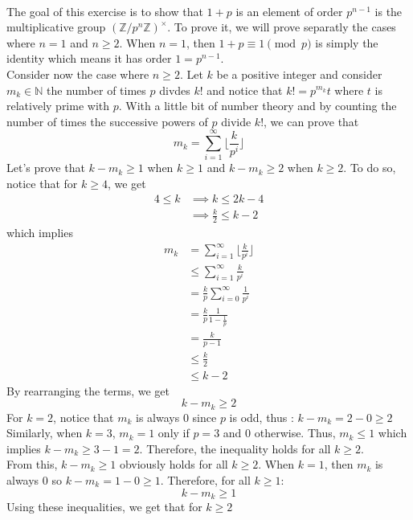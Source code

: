 \begin{solution}
    \\The goal of this exercise is to show that $1+p$ is an element of order $p^{n-1}$ is the multiplicative group $(\mathbb{Z}/p^n\mathbb{Z})^{\times}$. To prove it, we will prove separatly the cases where $n=1$ and $n \geq 2$. When $n=1$, then $1+p \equiv 1 \pmod{p}$ is simply the identity which means it has order $1 = p^{n-1}$. \\
    Consider now the case where $n \geq 2$. Let $k$ be a positive integer and consider $m_k \in \mathbb{N}$ the number of times $p$ divdes $k!$ and notice that $k!=p^{m_k}t$ where $t$ is relatively prime with $p$. With a little bit of number theory and by counting the number of times the successive powers of $p$ divide $k!$, we can prove that 
    $$m_k = \sum_{i=1}^{\infty} \biggl \lfloor \frac{k}{p^i} \biggr \rfloor$$
    Let's prove that $k - m_k \geq 1$ when $k \geq 1$ and $k - m_k \geq 2$ when $k \geq 2$. To do so, notice that for $k \geq 4$, we get 
    \begin{align*}
        4 \leq k &\implies k \leq 2k - 4 \\
        &\implies \frac{k}{2} \leq k - 2
    \end{align*}
    which implies
    \begin{align*}
        m_k &= \sum_{i=1}^{\infty} \biggl \lfloor \frac{k}{p^i} \biggr \rfloor \\
        &\leq \sum_{i=1}^{\infty}\frac{k}{p^i} \\
        &= \frac{k}{p} \sum_{i=0}^{\infty}\frac{1}{p^i} \\
        &= \frac{k}{p}\frac{1}{1 - \frac{1}{p}} \\
        &= \frac{k}{p-1} \\
        &\leq \frac{k}{2} \\
        &\leq k - 2
    \end{align*}
    By rearranging the terms, we get
    $$k - m_k \geq 2$$
    For $k = 2$, notice that $m_k$ is always $0$ since $p$ is odd, thus : $k - m_k = 2 - 0 \geq 2$
    Similarly, when $k=3$, $m_k = 1$ only if $p=3$ and $0$ otherwise. Thus, $m_k \leq 1$ which implies $k - m_k \geq 3 - 1 = 2$. Therefore, the inequality holds for all $k \geq 2$. \\
    From this, $k - m_k \geq 1$ obviously holds for all $k \geq 2$. When $k = 1$, then $m_k$ is always $0$ so $k - m_k = 1 - 0 \geq 1$. Therefore, for all $k \geq 1$:
    $$k - m_k \geq 1$$
    Using these inequalities, we get that for $k \geq 2$
    \begin{align*}

\end{align*}
\end{solution}
